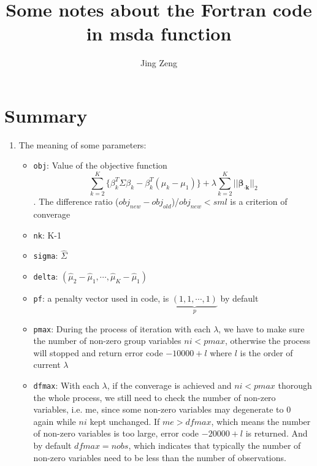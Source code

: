 \documentclass[12pt]{article}
\title{Some notes about the Fortran code in msda function}
\author{Jing Zeng}
\begin{document}
\maketitle
	


\section{Summary}

\begin{enumerate}[label={(\arabic*)}]
	\item The meaning of some parameters:
	\begin{itemize}
		\item \verb|obj|: Value of the objective function
		\[
			\sum_{k=2}^{K}\{\beta_k^T\Sigma\beta_k - \beta_k^T(\mu_k - \mu_1)\} + \lambda\sum_{k=2}^{K}||\bm{\beta_{\cdot k}}||_2
		\]
		. The difference ratio ($obj_{new} - obj_{old}$)/$obj_{new} < sml$ is a criterion of converage
		
		\item \verb|nk|: K-1
		\item \verb|sigma|: $\hat{\Sigma}$
		\item \verb|delta|: $(\hat{\mu}_2 - \hat{\mu}_1, \cdots, \hat{\mu}_K - \hat{\mu}_1)$
		\item \verb|pf|: a penalty vector used in code, is $\underbrace{(1,1,\cdots,1)}_{p}$ by default
		\item \verb|pmax|: During the process of iteration with each $\lambda$, we have to make sure the number of non-zero group variables $ni < pmax$, otherwise the process will stopped and return error code $-10000+l$ where $l$ is the order of current $\lambda$
		\item \verb|dfmax|: With each $\lambda$, if the converage is achieved and $ni < pmax$ thorough the whole process, we still need to check the number of non-zero variables, i.e. me, since some non-zero variables may degenerate to 0 again while $ni$ kept unchanged. If $me > dfmax$, which means the number of non-zero variables is too large, error code $-20000+l$ is returned. And by default $dfmax = nobs$, which indicates that typically the number of non-zero variables need to be less than the number of observations.
		

\end{itemize}
\end{enumerate}
\end{document}
